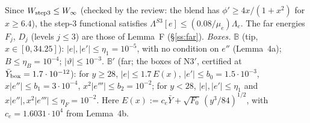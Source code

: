 \documentclass[11pt]{article}
\theoremstyle{definition}
\theoremstyle{remark}
\newcommand{\abs}[1]{\lvert #1\rvert}
\newcommand{\Yb}{\bar Y}
\newcommand{\Lam}{\Lambda}
\begin{document}
Since $W_{\rm step3}\le W_\infty$ (checked by the review: the blend has $\phi'\ge4x/(1+x^2)$ for $x\ge6.4$), the step-3 functional satisfies $\Lam^{S3}[e]\le(0.08/\mu_e)\Lam_e$. The far energies $F_j$, $D_j$ (levels $j\le3$) are those of Lemma~F (\S\ref{ss:far}).
\emph{Boxes.} $\mathbb B$ (tip, $x\in[0,34.25]$): $\abs e,\abs{e'}\le\eta_1=10^{-5}$, with no condition on $e''$ (Lemma~4a); $B\le\eta_B=10^{-4}$; $\abs\vartheta\le10^{-3}$. $\mathbb B'$ (far; the boxes of N3$'$, certified at $\Yb_{\rm box}=1.7\cdot10^{-12}$): for $y\ge28$, $\abs e\le1.7\,E(x)$, $\abs{e'}\le b_0=1.5\cdot10^{-3}$, $x\abs{e''}\le b_1=3\cdot10^{-4}$, $x^2\abs{e'''}\le b_2=10^{-2}$; for $y<28$, $\abs e,\abs{e'}\le\eta_1$ and $x\abs{e''},x^2\abs{e'''}\le\eta_F=10^{-2}$. Here $E(x):=c_e\Yb+\sqrt{F_0}\,(y^3/84)^{1/2}$, with $c_e=1.6031\cdot10^4$ from Lemma~4b.
\end{document}
